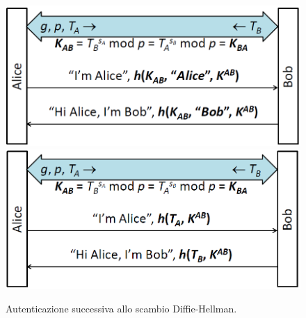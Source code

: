 \begin{figure}[htbp]
	\centering
	\subfigure
	{\includegraphics[scale=0.5, keepaspectratio]{Immagini/chiave_pubblica/DiffieHellman_auth4.png}}
	\hspace{2mm}
	\subfigure
	{\includegraphics[scale=0.5, keepaspectratio]{Immagini/chiave_pubblica/DiffieHellman_auth5.png}}
	\caption{Autenticazione successiva allo scambio Diffie-Hellman.}
	\label{fig:auth45}
\end{figure}

